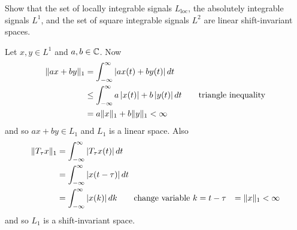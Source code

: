 \begin{excersizelist}

\item \label{exer:L1L2linearshiftinvariant} Show that the set of locally integrable signals $L_{\text{loc}}$, the absolutely integrable signals $L^1$, and the set of square integrable signals $L^2$ are linear shift-invariant spaces. 
\begin{solution}
Let $x, y \in L^1$ and $a, b \in {\mathbb C}$.  Now
\begin{align*}
\|a x + b y\|_1 &= \int_{-\infty}^\infty \left\vert ax(t) + by(t) \right\vert dt \\
&\leq \int_{-\infty}^\infty a\left\vert x(t) \right\vert + b\left\vert y(t) \right\vert dt \qquad \text{triangle inequality} \\
&= a \|x\|_1 + b\|y\|_1 < \infty
\end{align*}
and so $ax + by \in L_1$ and $L_1$ is a linear space.  Also
\begin{align*}
\|T_\tau x\|_1 &= \int_{-\infty}^\infty \left\vert  T_\tau x(t)  \right\vert dt \\
&= \int_{-\infty}^\infty \left\vert x(t - \tau) \right\vert dt \\
&= \int_{-\infty}^\infty \left\vert x(k) \right\vert dk \qquad \text{change variable $k = t - \tau$}
&= \|x\|_1 < \infty
\end{align*}
and so $L_1$ is a shift-invariant space.


\end{solution}
\end{excersizelist}

